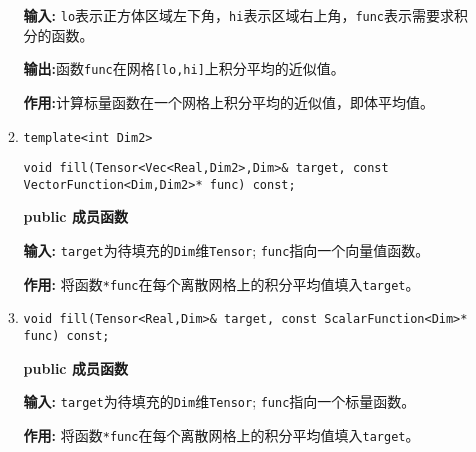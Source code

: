 \documentclass[UTF8]{ctexart}
\theoremstyle{plain}
\theoremstyle{definition}
\theoremstyle{remark}
\begin{document}
\begin{itemize}
\begin{enumerate}
        \textbf{输入:} \texttt{lo}表示正方体区域左下角，\texttt{hi}表示区域右上角，\texttt{func}表示需要求积分的函数。

        \textbf{输出:}函数\texttt{func}在网格\texttt{[lo,hi]}上积分平均的近似值。

        \textbf{作用:}计算标量函数在一个网格上积分平均的近似值，即体平均值。

        \item 
        \texttt{template<int Dim2>}

        \texttt{void fill(Tensor<Vec<Real,Dim2>,Dim>\& target, const VectorFunction<Dim,Dim2>* func) const;} 
        
        \textbf{public 成员函数}

        \textbf{输入:} \texttt{target}为待填充的\texttt{Dim}维\texttt{Tensor}; \texttt{func}指向一个向量值函数。

        \textbf{作用:} 将函数\texttt{*func}在每个离散网格上的积分平均值填入\texttt{target}。

        \item \texttt{void fill(Tensor<Real,Dim>\& target, const ScalarFunction<Dim>* func) const;}
        
        \textbf{public 成员函数}

        \textbf{输入:} \texttt{target}为待填充的\texttt{Dim}维\texttt{Tensor}; \texttt{func}指向一个标量函数。

        \textbf{作用:} 将函数\texttt{*func}在每个离散网格上的积分平均值填入\texttt{target}。
    \end{enumerate}
\end{itemize}
\end{document}
